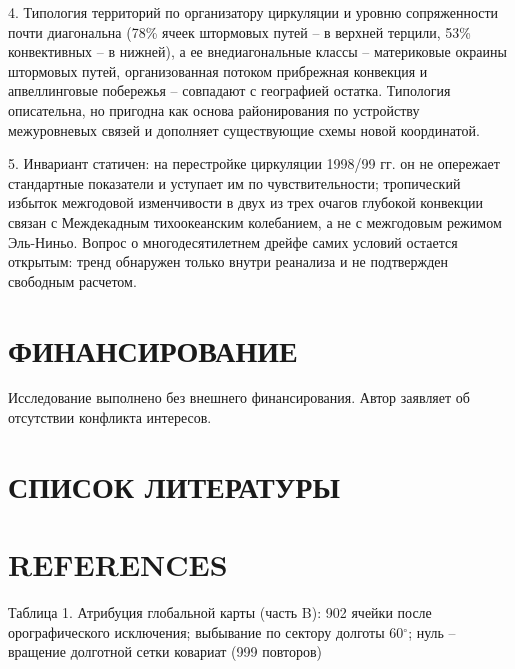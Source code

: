 \documentclass[12pt,a4paper]{article}
\begin{document}
4. Типология территорий по организатору циркуляции и уровню сопряженности почти диагональна (78\% ячеек штормовых путей -- в верхней терцили, 53\% конвективных -- в нижней), а ее внедиагональные классы -- материковые окраины штормовых путей, организованная потоком прибрежная конвекция и апвеллинговые побережья -- совпадают с географией остатка. Типология описательна, но пригодна как основа районирования по устройству межуровневых связей и дополняет существующие схемы новой координатой.

5. Инвариант статичен: на перестройке циркуляции 1998/99 гг. он не опережает стандартные показатели и уступает им по чувствительности; тропический избыток межгодовой изменчивости в двух из трех очагов глубокой конвекции связан с Междекадным тихоокеанским колебанием, а не с межгодовым режимом Эль-Ниньо. Вопрос о многодесятилетнем дрейфе самих условий остается открытым: тренд обнаружен только внутри реанализа и не подтвержден свободным расчетом.

\section{ФИНАНСИРОВАНИЕ}

Исследование выполнено без внешнего финансирования. Автор заявляет об отсутствии конфликта интересов.

\clearpage
\section{СПИСОК ЛИТЕРАТУРЫ}


\clearpage
\section{REFERENCES}


\clearpage
\noindent Таблица 1. Атрибуция глобальной карты (часть B): 902 ячейки после орографического исключения; выбывание по сектору долготы 60$^\circ$; нуль -- вращение долготной сетки ковариат (999 повторов)
\end{document}
